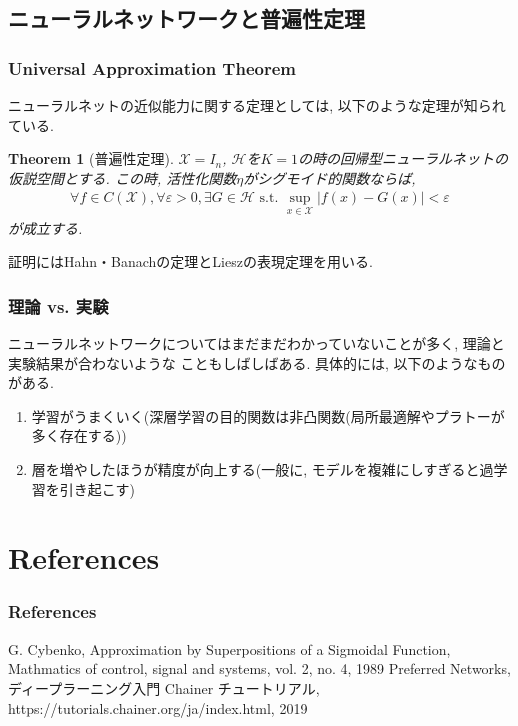 \documentclass[dvipdfmx,11pt]{beamer}		%
\newtheorem{thm}[defi]{Theorem}
\newcommand{\X}{\mathcal{X}}
\newcommand{\Hil}{\mathcal{H}}
\begin{document}
    \subsection{ニューラルネットワークと普遍性定理}
    \begin{frame}
        \frametitle{Universal Approximation Theorem}
        ニューラルネットの近似能力に関する定理としては, 以下のような定理が知られている. 
        \begin{thm}[普遍性定理\cite{UAT}]
            $\X=I_{n}$, $\Hil$を$K = 1$の時の回帰型ニューラルネットの仮説空間とする. 
            この時, 活性化関数$\eta$がシグモイド的関数ならば, 
            \begin{align*}
                \forall f\in C(\X), \forall\varepsilon> 0, \exists G\in\Hil\text{ s.t. } \sup_{x\in\X}|f(x) - G(x)| < \varepsilon
            \end{align*}
            が成立する. 
        \end{thm}
        証明にはHahn・Banachの定理とLieszの表現定理を用いる. 
    \end{frame}
    \begin{frame}
        \frametitle{理論 vs. 実験}
        ニューラルネットワークについてはまだまだわかっていないことが多く, 理論と実験結果が合わないような
        こともしばしばある. 具体的には, 以下のようなものがある.
            \begin{enumerate}
                \item 学習がうまくいく(深層学習の目的関数は非凸関数(局所最適解やプラトーが多く存在する))
                \item 層を増やしたほうが精度が向上する(一般に, モデルを複雑にしすぎると過学習を引き起こす)
            \end{enumerate}
    \end{frame}
    \section*{References}
    \begin{frame}\frametitle{References}
        \begin{thebibliography}{9}
            \beamertemplatetextbibitems
             G. Cybenko, Approximation by Superpositions of a Sigmoidal Function, 
                            Mathmatics of control, signal and systems, vol. 2, no. 4, 1989
		     Preferred Networks, ディープラーニング入門 Chainer チュートリアル,
            https://tutorials.chainer.org/ja/index.html, 2019
	    \end{thebibliography}
    \end{frame}
\end{document}
